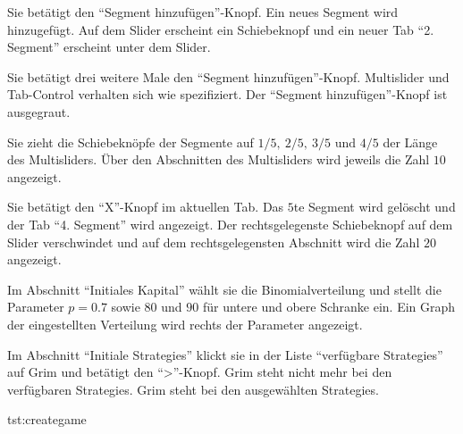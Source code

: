 \documentclass[parskip=full,11pt]{scrartcl}
\begin{document}
{Sie betätigt den \enquote{Segment hinzufügen}-Knopf.}
{Ein neues Segment wird hinzugefügt. Auf dem Slider erscheint ein Schiebeknopf und ein neuer Tab \enquote{2. Segment} erscheint unter dem Slider.}

{Sie betätigt drei weitere Male den \enquote{Segment hinzufügen}-Knopf.}
{\Gls{Multislider} und Tab-Control verhalten sich wie spezifiziert. Der \enquote{Segment hinzufügen}-Knopf ist ausgegraut.}

{Sie zieht die Schiebeknöpfe der Segmente auf \(1/5,\ 2/5,\ 3/5 \text{ und } 4/5\) der Länge des \Glspl{Multislider}.}
{Über den Abschnitten des \Glspl{Multislider} wird jeweils die Zahl \(10\) angezeigt.}

{Sie betätigt den \enquote{X}-Knopf im aktuellen Tab.}
{Das \(5\)te Segment wird gelöscht und der Tab \enquote{4. Segment} wird angezeigt. Der rechtsgelegenste Schiebeknopf auf dem Slider verschwindet und auf dem rechtsgelegensten Abschnitt wird die Zahl \(20\) angezeigt.}

{Im Abschnitt \enquote{Initiales Kapital} wählt sie die Binomialverteilung und stellt die Parameter \(p = 0.7\) sowie \(80\) und \(90\) für untere und obere Schranke ein.}
{Ein Graph der eingestellten Verteilung wird rechts der Parameter angezeigt.}

{Im Abschnitt \enquote{Initiale \Glspl{Strategie}} klickt sie in der Liste \enquote{verfügbare \Glspl{Strategie}} auf Grim und betätigt den \enquote{>}-Knopf.}
{Grim steht nicht mehr bei den verfügbaren \Glspl{Strategie}. Grim steht bei den ausgewählten \Glspl{Strategie}.}

{tst:creategame}
\end{document}
